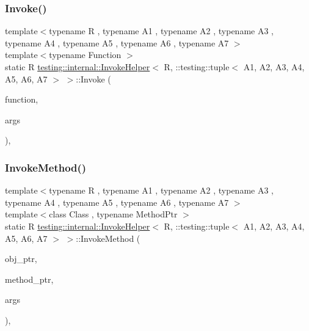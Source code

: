 \subsubsection{\texorpdfstring{Invoke()}{Invoke()}}
{\footnotesize\ttfamily template$<$typename R , typename A1 , typename A2 , typename A3 , typename A4 , typename A5 , typename A6 , typename A7 $>$ \\
template$<$typename Function $>$ \\
static R \mbox{\hyperlink{classtesting_1_1internal_1_1_invoke_helper}{testing\+::internal\+::\+Invoke\+Helper}}$<$ R, \+::testing\+::tuple$<$ A1, A2, A3, A4, A5, A6, A7 $>$ $>$\+::Invoke (\begin{DoxyParamCaption}\item[{\mbox{\hyperlink{structtesting_1_1internal_1_1_function}{Function}}}]{function,  }\item[{const \+::testing\+::tuple$<$ A1, A2, A3, A4, A5, A6, A7 $>$ \&}]{args }\end{DoxyParamCaption})\hspace{0.3cm}{\ttfamily [inline]}, {\ttfamily [static]}}

\mbox{\label{classtesting_1_1internal_1_1_invoke_helper_3_01_r_00_01_1_1testing_1_1tuple_3_01_a1_00_01_a2_00_9169216bddd5005837acd145af38ec6f_acd27c62b37fa4f9284dccd8827ddd7af}} 
\subsubsection{\texorpdfstring{InvokeMethod()}{InvokeMethod()}}
{\footnotesize\ttfamily template$<$typename R , typename A1 , typename A2 , typename A3 , typename A4 , typename A5 , typename A6 , typename A7 $>$ \\
template$<$class Class , typename Method\+Ptr $>$ \\
static R \mbox{\hyperlink{classtesting_1_1internal_1_1_invoke_helper}{testing\+::internal\+::\+Invoke\+Helper}}$<$ R, \+::testing\+::tuple$<$ A1, A2, A3, A4, A5, A6, A7 $>$ $>$\+::Invoke\+Method (\begin{DoxyParamCaption}\item[{Class $\ast$}]{obj\+\_\+ptr,  }\item[{Method\+Ptr}]{method\+\_\+ptr,  }\item[{const \+::testing\+::tuple$<$ A1, A2, A3, A4, A5, A6, A7 $>$ \&}]{args }\end{DoxyParamCaption})\hspace{0.3cm}{\ttfamily [inline]}, {\ttfamily [static]}}



